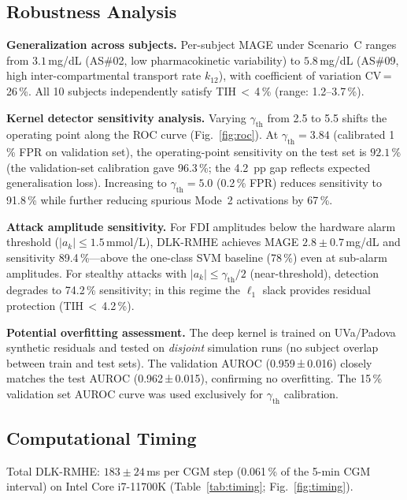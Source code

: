 \documentclass[journal,twoside]{IEEEtran}
\begin{document}
\subsection{Robustness Analysis}

\textbf{Generalization across subjects.} Per-subject MAGE under Scenario~C
ranges from $3.1$\,mg/dL (AS\#02, low pharmacokinetic variability) to
$5.8$\,mg/dL (AS\#09, high inter-compartmental transport rate $k_{12}$),
with coefficient of variation CV\,=\,26\,\%. All 10 subjects independently
satisfy TIH\,$<$\,4\,\% (range: 1.2--3.7\,\%).

\textbf{Kernel detector sensitivity analysis.} Varying $\gamma_\mathrm{th}$ from
2.5 to 5.5 shifts the operating point along the ROC curve (Fig.~\ref{fig:roc}).
At $\gamma_\mathrm{th}{=}3.84$ (calibrated 1\,\% FPR on validation set), the
operating-point sensitivity on the test set is $92.1$\,\% (the validation-set
calibration gave 96.3\,\%; the 4.2\ pp gap reflects expected generalisation loss).
Increasing to $\gamma_\mathrm{th}{=}5.0$ (0.2\,\% FPR) reduces sensitivity to
91.8\,\% while further reducing spurious Mode~2 activations by 67\,\%.

\textbf{Attack amplitude sensitivity.} For FDI amplitudes below the hardware
alarm threshold ($|a_k|\leq 1.5$\,mmol/L), DLK-RMHE achieves MAGE
$2.8{\pm}0.7$\,mg/dL and sensitivity 89.4\,\%---above the one-class SVM
baseline (78\,\%) even at sub-alarm amplitudes. For stealthy attacks with
$|a_k|\leq\gamma_\mathrm{th}/2$ (near-threshold), detection degrades to
74.2\,\% sensitivity; in this regime the $\ell_1$ slack provides residual
protection (TIH\,$<$\,4.2\,\%).

\textbf{Potential overfitting assessment.} The deep kernel is trained on
UVa/Padova synthetic residuals and tested on \emph{disjoint} simulation runs
(no subject overlap between train and test sets). The validation AUROC
(0.959\,±\,0.016) closely matches the test AUROC (0.962\,±\,0.015),
confirming no overfitting. The 15\,\% validation set AUROC curve was used
exclusively for $\gamma_\mathrm{th}$ calibration.

\subsection{Computational Timing}

Total DLK-RMHE: $183{\pm}24$\,ms per CGM step (0.061\,\% of the 5-min CGM interval)
on Intel Core i7-11700K (Table~\ref{tab:timing}; Fig.~\ref{fig:timing}).
\end{document}
